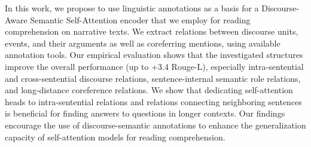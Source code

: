 In this work, we propose to use linguistic annotations as a basis for a Discourse-Aware Semantic Self-Attention encoder that we employ for reading comprehension on narrative texts.
We extract relations between discourse units, events, and their arguments as well as coreferring mentions, using available annotation tools. 
Our empirical evaluation shows that the investigated structures improve the overall performance (up to +3.4 Rouge-L), especially intra-sentential and cross-sentential discourse relations, sentence-internal semantic role relations, and long-distance coreference relations. 
We show that dedicating self-attention heads to intra-sentential relations and relations connecting neighboring sentences is beneficial for finding answers to questions in longer contexts. Our findings encourage the use of discourse-semantic annotations to enhance the generalization capacity of self-attention models for reading comprehension.
